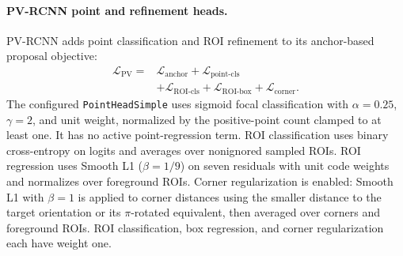 \documentclass[10pt,twocolumn]{article}
\begin{document}
\paragraph{PV-RCNN point and refinement heads.}
PV-RCNN adds point classification and ROI refinement to its anchor-based proposal objective:
\begin{equation}
\begin{aligned}
\mathcal{L}_{\mathrm{PV}}={}&\mathcal{L}_{\mathrm{anchor}}
+\mathcal{L}_{\mathrm{point\text{-}cls}}\\
&+\mathcal{L}_{\mathrm{ROI\text{-}cls}}
+\mathcal{L}_{\mathrm{ROI\text{-}box}}
+\mathcal{L}_{\mathrm{corner}}.
\end{aligned}
\end{equation}
The configured \texttt{PointHeadSimple} uses sigmoid focal classification with $\alpha=0.25$, $\gamma=2$, and unit weight, normalized by the positive-point count clamped to at least one. It has no active point-regression term. ROI classification uses binary cross-entropy on logits and averages over nonignored sampled ROIs. ROI regression uses Smooth L1 ($\beta=1/9$) on seven residuals with unit code weights and normalizes over foreground ROIs. Corner regularization is enabled: Smooth L1 with $\beta=1$ is applied to corner distances using the smaller distance to the target orientation or its $\pi$-rotated equivalent, then averaged over corners and foreground ROIs. ROI classification, box regression, and corner regularization each have weight one.
\end{document}
